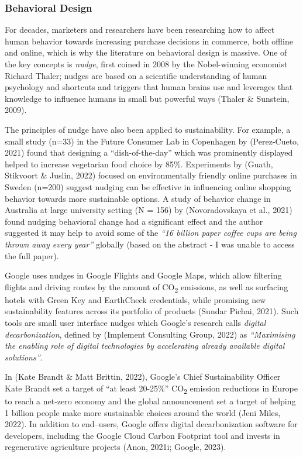 \documentclass[
  letterpaper,
  DIV=11,
  numbers=noendperiod]{scrartcl}
\begin{document}
\subsubsection{Behavioral Design}\label{behavioral-design}

For decades, marketers and researchers have been researching how to
affect human behavior towards increasing purchase decisions in commerce,
both offline and online, which is why the literature on behavioral
design is massive. One of the key concepts is \emph{nudge}, first coined
in 2008 by the Nobel-winning economist Richard Thaler; nudges are based
on a scientific understanding of human psychology and shortcuts and
triggers that human brains use and leverages that knowledge to influence
humans in small but powerful ways (Thaler \& Sunstein, 2009).

The principles of nudge have also been applied to sustainability. For
example, a small study (n=33) in the Future Consumer Lab in Copenhagen
by (Perez-Cueto, 2021) found that designing a ``dish-of-the-day'' which
was prominently displayed helped to increase vegetarian food choice by
85\%. Experiments by (Guath, Stikvoort \& Juslin, 2022) focused on
environmentally friendly online purchases in Sweden (n=200) suggest
nudging can be effective in influencing online shopping behavior towards
more sustainable options. A study of behavior change in Australia at
large university setting (N = 156) by (Novoradovskaya et al., 2021)
found nudging behavioral change had a significant effect and the author
suggested it may help to avoid some of the \emph{``16 billion paper
coffee cups are being thrown away every year''} globally (based on the
abstract - I was unable to access the full paper).

Google uses nudges in Google Flights and Google Maps, which allow
filtering flights and driving routes by the amount of
CO\textsubscript{2} emissions, as well as surfacing hotels with Green
Key and EarthCheck credentials, while promising new sustainability
features across its portfolio of products (Sundar Pichai, 2021). Such
tools are small user interface nudges which Google's research calls
\emph{digital decarbonization}, defined by (Implement Consulting Group,
2022) as \emph{``Maximising the enabling role of digital technologies by
accelerating already available digital solutions''}.

In (Kate Brandt \& Matt Brittin, 2022), Google's Chief Sustainability
Officer Kate Brandt set a target of ``at least 20-25\%''
CO\textsubscript{2} emission reductions in Europe to reach a net-zero
economy and the global announcement set a target of helping 1 billion
people make more sustainable choices around the world (Jeni Miles,
2022). In addition to end--users, Google offers digital decarbonization
software for developers, including the Google Cloud Carbon Footprint
tool and invests in regenerative agriculture projects (Anon, 2021i;
Google, 2023).
\end{document}
